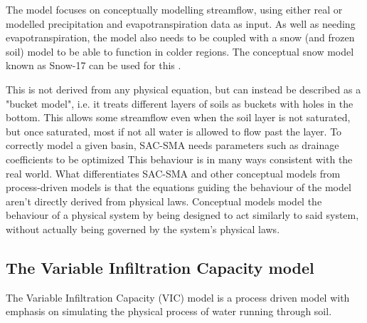 The model focuses on conceptually modelling streamflow, using either real or modelled 
precipitation and evapotranspiration data as input. As well as needing evapotranspiration,
 the model also needs to be 
coupled with a snow (and frozen soil) model to be able to function in colder regions.
The conceptual snow model known as Snow-17 can be used for this \citep{snow-17, VICbench}.

This is not derived 
from any physical equation, but can instead be described as a "bucket model", 
i.e. it treats different layers of soils as buckets with holes in the bottom. This 
allows some streamflow even when the soil layer is not saturated, but once saturated, 
most if not all water is allowed to flow past the layer.
To correctly model a given basin, SAC-SMA needs parameters such as 
drainage coefficients to be optimized 
This behaviour is in many ways consistent with the real world. What differentiates 
SAC-SMA and other conceptual models from process-driven models is that the equations 
guiding the behaviour of the model aren't directly derived from physical laws.
Conceptual models model the behaviour of a physical system by being designed to 
act similarly to said system, without actually being governed by the system's 
physical laws.
\begin{comment}
The equations guiding the output of SAC-SMA are on the following form:
\begin{align}
u_c = \left( d_ux_2+\frac{d_1'x_4+d_1''x_5}{1-\mu} \right)\left(1-\beta_1-\beta_2\right)
 + \phi x_p\beta_2 \nonumber \\ + \left(\frac{x_6-x_1}{x_3^\circ}\right)^2\phi x_p 
\left(\frac{x_1}{x_1^\circ}\right)^{m_1}\beta_1+\phi x_p 
\left(\frac{x_1}{x_1^\circ}\right)^{m_1}\left(\frac{x_2}{x_2^\circ}\right)^{m_2}
\left(1 - \beta_1 - \beta_2 \right) \nonumber \\ + \left[ 1 - \left(1-\frac{x_6-x_1}{x_3^\circ} \right)^2
\right]\left(\frac{x_2}{x_2^\circ}\right)^{m_2}\left(\frac{x_1}{x_1^\circ}\right)^{m_1}
\phi x_p \beta_1 .
\end{align}
\end{comment}
\subsection{The Variable Infiltration Capacity model}
\label{VIC}
The Variable Infiltration Capacity (VIC) model \citep{VIC} is a process driven model 
with emphasis on simulating the physical process of water running through soil.

